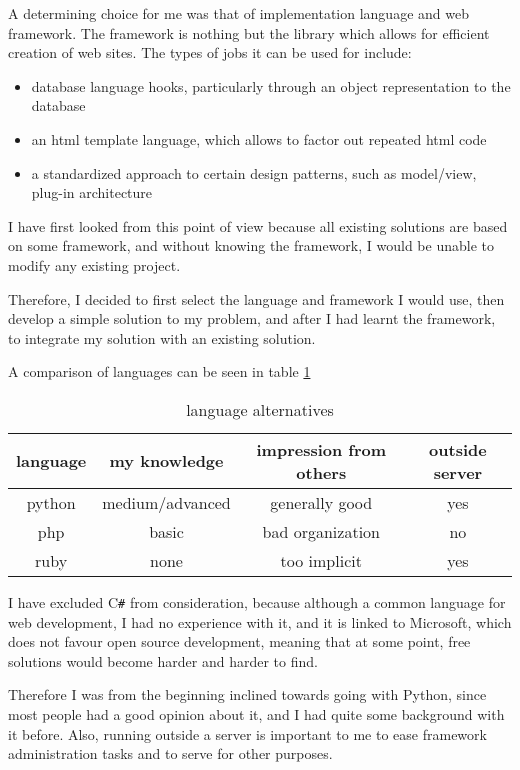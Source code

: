 \documentclass[12pt]{article}
\begin{document}
A determining choice for me was that of implementation language and web framework. The framework is nothing but the library which allows for efficient creation of web sites. The types of jobs it can be used for include:

\begin{itemize}
  \item database language hooks, particularly through an object representation to the database
  \item an html template language, which allows to factor out repeated html code
  \item a standardized approach to certain design patterns, such as model/view, plug-in architecture
\end{itemize}

I have first looked from this point of view because all existing solutions are based on some framework,
and without knowing the framework, I would be unable to modify any existing project.

Therefore, I decided to first select the language and framework I would use,
then develop a simple solution to my problem, and after I had learnt the framework,
to integrate my solution with an existing solution.

A comparison of languages can be seen in table \ref{tab1}

\begin{table}[h]
  \centering
  \begin{tabular}{cccc}
    language & my knowledge & impression from others & outside server \\  		    
		\hline
		python & medium/advanced & generally good & yes \\
    php & basic & bad organization & no \\
    ruby & none & too implicit & yes \\
  \end{tabular}
  \caption{language alternatives}
  \label{tab1}
\end{table}

I have excluded C\verb!#! from consideration, because although a common language for web
development, I had no experience with it, and it is linked to Microsoft, which
does not favour open source development, meaning that at some point, free solutions
would become harder and harder to find.

Therefore I was from the beginning inclined towards going with Python, since most people
had a good opinion about it, and I had quite some background with it before. Also,
running outside a server is important to me to ease framework administration tasks
and to serve for other purposes.
\end{document}
